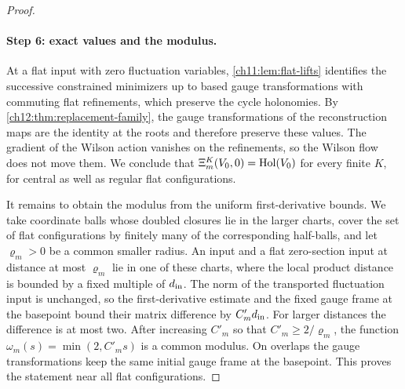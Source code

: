 \begin{proof}
\paragraph{Step 6: exact values and the modulus.}
At a flat input with zero fluctuation variables, \cref{ch11:lem:flat-lifts} identifies the successive constrained minimizers up to based gauge transformations with commuting flat refinements, which preserve the cycle holonomies. By \cref{ch12:thm:replacement-family}, the gauge transformations of the reconstruction maps are the identity at the roots and therefore preserve these values. The gradient of the Wilson action vanishes on the refinements, so the Wilson flow does not move them. We conclude that $\Xi_m^K(V_0,0)=\operatorname{Hol}(V_0)$ for every finite $K$, for central as well as regular flat configurations.

It remains to obtain the modulus from the uniform first-derivative bounds. We take coordinate balls whose doubled closures lie in the larger charts, cover the set of flat configurations by finitely many of the corresponding half-balls, and let $\varrho_m>0$ be a common smaller radius. An input and a flat zero-section input at distance at most $\varrho_m$ lie in one of these charts, where the local product distance is bounded by a fixed multiple of $d_{\rm in}$. The norm of the transported fluctuation input is unchanged, so the first-derivative estimate and the fixed gauge frame at the basepoint bound their matrix difference by $C'_md_{\rm in}$. For larger distances the difference is at most two. After increasing $C'_m$ so that $C'_m\ge2/\varrho_m$, the function $\omega_m(s)=\min(2,C'_ms)$ is a common modulus. On overlaps the gauge transformations keep the same initial gauge frame at the basepoint. This proves the statement near all flat configurations.
\end{proof}

